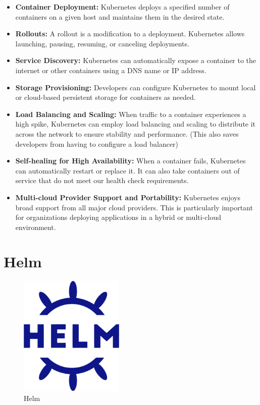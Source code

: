 \begin{itemize}
    \item \textbf{Container Deployment:} Kubernetes deploys a specified number of containers on a given host and maintains them in the desired state.
    \item \textbf{Rollouts:} A rollout is a modification to a deployment. Kubernetes allows launching, pausing, resuming, or canceling deployments.
    \item \textbf{Service Discovery:} Kubernetes can automatically expose a container to the internet or other containers using a DNS name or IP address.
    \item \textbf{Storage Provisioning:} Developers can configure Kubernetes to mount local or cloud-based persistent storage for containers as needed.
    \item \textbf{Load Balancing and Scaling:} When traffic to a container experiences a high spike, Kubernetes can employ load balancing and scaling to distribute it across the network to ensure stability and performance. (This also saves developers from having to configure a load balancer)
    \item \textbf{Self-healing for High Availability:} When a container fails, Kubernetes can automatically restart or replace it. It can also take containers out of service that do not meet our health check requirements.
    \item \textbf{Multi-cloud Provider Support and Portability:} Kubernetes enjoys broad support from all major cloud providers. This is particularly important for organizations deploying applications in a hybrid or multi-cloud environment.
\end{itemize}

\section{Helm}

\begin{figure}[H]
  \centering
  \includegraphics[width=5cm]{Figures/helm-logo.png}
  \caption{Helm}
  \label{fig:helm}
\end{figure}

